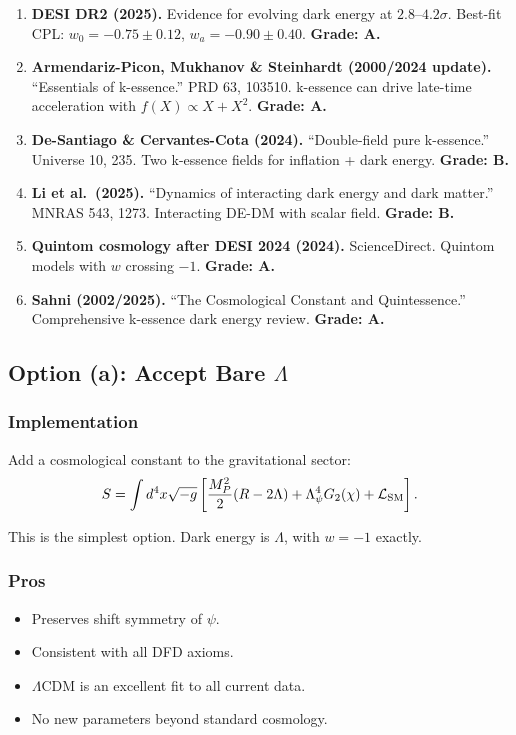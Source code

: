 \documentclass[11pt,a4paper]{article}
\begin{document}
\begin{enumerate}
\item \textbf{DESI DR2 (2025).} Evidence for evolving dark energy at $2.8$--$4.2\sigma$. Best-fit CPL: $w_0 = -0.75 \pm 0.12$, $w_a = -0.90 \pm 0.40$. \textbf{Grade: A.}

\item \textbf{Armendariz-Picon, Mukhanov \& Steinhardt (2000/2024 update).} ``Essentials of k-essence.'' PRD 63, 103510. k-essence can drive late-time acceleration with $f(X) \propto X + X^2$. \textbf{Grade: A.}

\item \textbf{De-Santiago \& Cervantes-Cota (2024).} ``Double-field pure k-essence.'' Universe 10, 235. Two k-essence fields for inflation + dark energy. \textbf{Grade: B.}

\item \textbf{Li et al.\ (2025).} ``Dynamics of interacting dark energy and dark matter.'' MNRAS 543, 1273. Interacting DE-DM with scalar field. \textbf{Grade: B.}

\item \textbf{Quintom cosmology after DESI 2024 (2024).} ScienceDirect. Quintom models with $w$ crossing $-1$. \textbf{Grade: A.}

\item \textbf{Sahni (2002/2025).} ``The Cosmological Constant and Quintessence.'' Comprehensive k-essence dark energy review. \textbf{Grade: A.}
\end{enumerate}

\subsection{Option (a): Accept Bare $\Lambda$}

\subsubsection{Implementation}

Add a cosmological constant to the gravitational sector:
\begin{equation}
S = \int d^4x\sqrt{-g}\left[\frac{M_P^2}{2}(R - 2\Lambda) + \Lambda_\psi^4 G_2(\chi) + \mathcal{L}_{\rm SM}\right].
\end{equation}

This is the simplest option. Dark energy is $\Lambda$, with $w = -1$ exactly.

\subsubsection{Pros}
\begin{itemize}
\item Preserves shift symmetry of $\psi$.
\item Consistent with all DFD axioms.
\item $\Lambda$CDM is an excellent fit to all current data.
\item No new parameters beyond standard cosmology.
\end{itemize}
\end{document}

